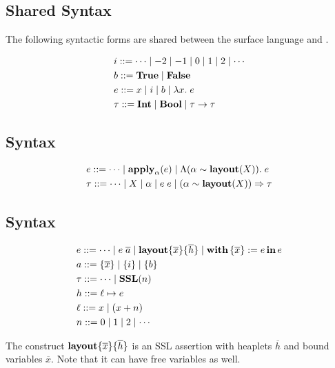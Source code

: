 \subsection{Shared Syntax}

The following syntactic forms are shared between the \Pika{} surface language and \PikaCore.

\begin{align*}
  &i ::= \cdots \mid -2 \mid -1 \mid 0 \mid 1 \mid 2 \mid \cdots
  \\
  &b ::= \textbf{True}{} \mid \textbf{False}
  \\
  &e ::= x \mid i \mid b \mid \lambda x.\; e
  \\
  &\tau ::= \textbf{Int} \mid \textbf{Bool} \mid \tau \rightarrow \tau
\end{align*}

\subsection{\Pika{} Syntax}
\begin{align*}
  &e ::= \cdots \mid \textbf{apply}_{\alpha}(e) \mid \Lambda (\alpha \sim \textbf{layout}(X)).\; e
  \\
  &\tau ::= \cdots \mid X \mid \alpha \mid e\; e \mid (\alpha \sim \textbf{layout}(X)) \Rightarrow \tau
\end{align*}

\subsection{\PikaCore{} Syntax}
\begin{align*}
  &e ::= \cdots \mid e\; \overline{a} \mid \textbf{layout}\{ \overline{x} \}\{ \overline{h} \} \mid \textbf{with}\,\{ \overline{x} \} := e\,\textbf{in}\, e
  \\
  &a ::= \{ \overline{x} \} \mid \{ i \} \mid \{ b \}
  \\
  &\tau ::= \cdots \mid \textbf{SSL}(n)
  \\
  &h ::= \ell \mapsto e
  \\
  &\ell ::= x \mid (x + n)
  \\
  &n ::= 0 \mid 1 \mid 2 \mid \cdots
\end{align*}

The construct $\textbf{layout}\{ \overline{x} \}\{ \overline{h} \}$ is an SSL assertion with heaplets $\overline{h}$ and
bound variables $\overline{x}$. Note that it can have free variables as well.

